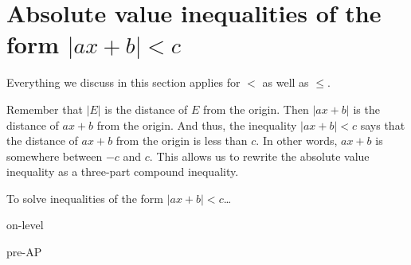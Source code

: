 \section*{Absolute value inequalities of the form $| ax + b | < c$}

\begin{center}
    \begin{tcolorbox}[width=3.5in]
        Everything we discuss in this section applies for $<$ as well as $\leq$.
    \end{tcolorbox}
\end{center}

Remember that $|E|$ is the distance of $E$ from the origin.
Then $| ax + b |$ is the distance of $ax+b$ from the origin.
And thus, the inequality $|ax+b| < c$ says that the distance of $ax+b$ from the origin is less than $c$.
In other words, $ax+b$ is somewhere between $-c$ and $c$.
This allows us to rewrite the absolute value inequality as a three-part compound inequality.


\begin{myConceptSteps}{To solve inequalities of the form $| ax + b | < c$\dots}
\end{myConceptSteps}


\begin{center}
\end{center}




\begin{taggedblock}{on-level}
\end{taggedblock}
\begin{taggedblock}{pre-AP}
\end{taggedblock}


